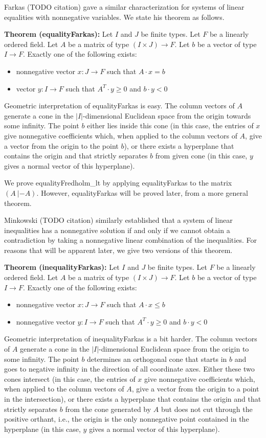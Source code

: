 \documentclass[]{article}
\renewcommand{\.}{\hskip .75pt}
\let\r=\rightarrow
\let\*=\cdot
\begin{document}
Farkas (TODO citation) gave a similar characterization for systems of linear equalities
with nonnegative variables.
We state his theorem as follows.

\medskip \noindent
\textbf{Theorem (equalityFarkas):}
Let $I$ and $J$ be finite types.
Let $F$ be a linearly ordered field.
Let $A$ be a matrix of type $(I \times J) \r F$.
Let $b$ be a vector of type $I \r F$.
Exactly one of the following exists:
\begin{itemize}
\item nonnegative vector $x : J \r F$ such that $A \* x = b$
\item vector $y : I \r F$ such that $A^T\! \* y \ge 0$ and $b \* y < 0$
\end{itemize}
Geometric interpretation of equalityFarkas is easy.
The column vectors of $A$ generate a cone in the
$|I|$-dimensional Euclidean space from the origin towards some infinity.
The point $b$ either lies inside this cone (in this case, the entries
of $x$ give nonnegative coefficients which,
when applied to the column vectors of $A$,
give a vector from the origin to the point $b$),
or there exists a hyperplane that contains the origin and that
strictly separates $b$ from given cone
(in this case, $y$ gives a normal vector of this hyperplane).

We prove equalityFredholm\_lt by applying equalityFarkas to the matrix $(A~|-\!\! A)$.
However, equalityFarkas will be proved later, from a more general theorem.

Minkowski (TODO citation) similarly established that
a system of linear inequalities has a nonnegative solution if and only if
we cannot obtain a contradiction by taking a nonnegative linear combination of the inequalities.
For reasons that will be apparent later, we give two versions of this theorem.

\medskip \noindent
\textbf{Theorem (inequalityFarkas):}
Let $I$ and $J$ be finite types.
Let $F$ be a linearly ordered field.
Let $A$ be a matrix of type $(I \times J) \r F$.
Let $b$ be a vector of type $I \r F$.
Exactly one of the following exists:
\begin{itemize}
\item nonnegative vector $x : J \r F$ such that $A \* x \le b$
\item nonnegative vector $y : I \r F$ such that $A^T\! \* y \ge 0$ and $b \* y < 0$
\end{itemize}
Geometric interpretation of inequalityFarkas is a bit harder.
The column vectors of $A$ generate a cone in the
$|I|$-dimensional Euclidean space from the origin to some infinity.
The point $b$ determines an orthogonal cone that starts in $b$ and goes to
negative infinity in the direction of all coordinate axes.
Either these two cones intersect (in this case, the entries
of $x$ give nonnegative coefficients which,
when applied to the column vectors of $A$,
give a vector from the origin to a point in the intersection),
or there exists a hyperplane that contains the origin and that
strictly separates $b$ from the cone generated by $A$ but
does not cut through the positive orthant, i.e., the origin
is the only nonnegative point contained in the hyperplane
(in this case, $y$ gives a normal vector of this hyperplane).
\end{document}
